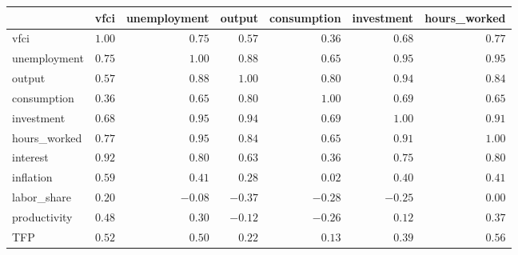 \begin{longtable}{l|rrrrrr}
\toprule
\multicolumn{1}{l}{} & vfci & unemployment & output & consumption & investment & hours\_worked \\ 
\midrule\addlinespace[2.5pt]
vfci & $1.00$ & $0.75$ & $0.57$ & $0.36$ & $0.68$ & $0.77$ \\ 
unemployment & $0.75$ & $1.00$ & $0.88$ & $0.65$ & $0.95$ & $0.95$ \\ 
output & $0.57$ & $0.88$ & $1.00$ & $0.80$ & $0.94$ & $0.84$ \\ 
consumption & $0.36$ & $0.65$ & $0.80$ & $1.00$ & $0.69$ & $0.65$ \\ 
investment & $0.68$ & $0.95$ & $0.94$ & $0.69$ & $1.00$ & $0.91$ \\ 
hours\_worked & $0.77$ & $0.95$ & $0.84$ & $0.65$ & $0.91$ & $1.00$ \\ 
interest & $0.92$ & $0.80$ & $0.63$ & $0.36$ & $0.75$ & $0.80$ \\ 
inflation & $0.59$ & $0.41$ & $0.28$ & $0.02$ & $0.40$ & $0.41$ \\ 
labor\_share & $0.20$ & $-0.08$ & $-0.37$ & $-0.28$ & $-0.25$ & $0.00$ \\ 
productivity & $0.48$ & $0.30$ & $-0.12$ & $-0.26$ & $0.12$ & $0.37$ \\ 
TFP & $0.52$ & $0.50$ & $0.22$ & $0.13$ & $0.39$ & $0.56$ \\ 
\bottomrule
\end{longtable}
